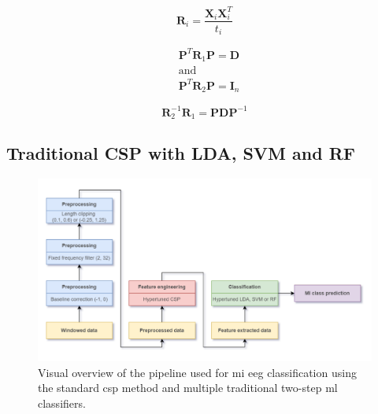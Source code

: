 \begin{equation}
    \label{eq:offline_bci_system_csp_cov}
    \mathbf{R}_i = \frac{ \mathbf{X}_i \mathbf{X}_i^T }{t_i}
\end{equation}

\begin{equation}
    \label{eq:offline_bci_system_csp_solution}
    \begin{aligned}
        &\mathbf{P}^T \mathbf{R}_1 \mathbf{P} = \mathbf{D}
        \\
        &\text{and}
        \\
        &\mathbf{P}^T \mathbf{R}_2 \mathbf{P} = \mathbf{I}_n
    \end{aligned}
\end{equation}

\begin{equation}
    \label{eq:offline_bci_system_csp_solution_eigen}
    \mathbf{R}^{-1}_2 \mathbf{R}_1 = \mathbf{P} \mathbf{D} \mathbf{P}^{-1}
\end{equation}



\subsection{Traditional CSP with LDA, SVM and RF}
\label{subsec:offline_bci_system_two_step_ml_basic_csp}

\begin{figure}[t]
    \centering
    \includegraphics[width=\linewidth]{../images/offline/csp_fixed_filter_pipeline.pdf}
    \captionsetup{width=0.8\linewidth}
    \captionsetup{justification=centering}
    \caption{Visual overview of the pipeline used for \gls{mi} \gls{eeg} classification using the standard \gls{csp} method and multiple traditional two-step \gls{ml} classifiers.}
    \label{fig:offline_bci_system_csp_fixed_filter_pipeline}
\end{figure}

